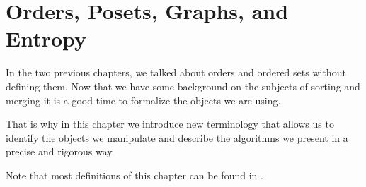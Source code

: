 \chapter{Orders, Posets, Graphs, and Entropy}

In the two previous chapters, we talked about orders and ordered sets without
defining them. Now that we have some background on the subjects of
sorting and merging it is a good time to formalize the objects we are using.

That is why in this chapter we introduce new terminology that allows
us to identify the objects we manipulate and describe the algorithms we present
in a precise and rigorous way.

Note that most definitions of this chapter can be found in
\citet*{Stanley:2011:ECV:2124415}.
